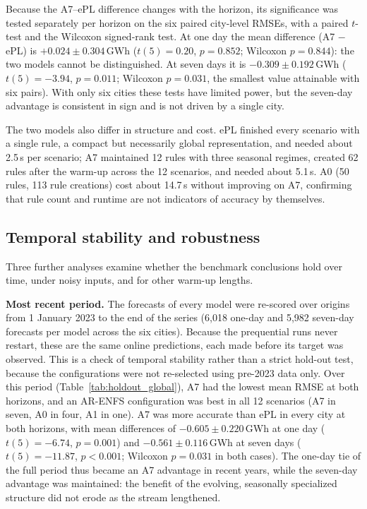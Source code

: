 \documentclass[preprint,12pt]{elsarticle}
\begin{document}
Because the A7--ePL difference changes with the horizon, its significance was tested separately per horizon on the six paired city-level RMSEs, with a paired $t$-test and the Wilcoxon signed-rank test. At one day the mean difference (A7 $-$ ePL) is $+0.024\pm0.304$\,GWh ($t(5)=0.20$, $p=0.852$; Wilcoxon $p=0.844$): the two models cannot be distinguished. At seven days it is $-0.309\pm0.192$\,GWh ($t(5)=-3.94$, $p=0.011$; Wilcoxon $p=0.031$, the smallest value attainable with six pairs). With only six cities these tests have limited power, but the seven-day advantage is consistent in sign and is not driven by a single city.

The two models also differ in structure and cost. ePL finished every scenario with a single rule, a compact but necessarily global representation, and needed about 2.5\,s per scenario; A7 maintained 12 rules with three seasonal regimes, created 62 rules after the warm-up across the 12 scenarios, and needed about 5.1\,s. A0 (50 rules, 113 rule creations) cost about 14.7\,s without improving on A7, confirming that rule count and runtime are not indicators of accuracy by themselves.

\subsection{Temporal stability and robustness}
\label{subsec:additional_validation}
\label{subsubsec:temporal_confirmation}
\label{subsubsec:perturbation_robustness}
\label{subsubsec:warmup_sensitivity}

Three further analyses examine whether the benchmark conclusions hold over time, under noisy inputs, and for other warm-up lengths.

\textbf{Most recent period.} The forecasts of every model were re-scored over origins from 1 January 2023 to the end of the series (6{,}018 one-day and 5{,}982 seven-day forecasts per model across the six cities). Because the prequential runs never restart, these are the same online predictions, each made before its target was observed. This is a check of temporal stability rather than a strict hold-out test, because the configurations were not re-selected using pre-2023 data only. Over this period (Table~\ref{tab:holdout_global}), A7 had the lowest mean RMSE at both horizons, and an AR-ENFS configuration was best in all 12 scenarios (A7 in seven, A0 in four, A1 in one). A7 was more accurate than ePL in every city at both horizons, with mean differences of $-0.605\pm0.220$\,GWh at one day ($t(5)=-6.74$, $p=0.001$) and $-0.561\pm0.116$\,GWh at seven days ($t(5)=-11.87$, $p<0.001$; Wilcoxon $p=0.031$ in both cases). The one-day tie of the full period thus became an A7 advantage in recent years, while the seven-day advantage was maintained: the benefit of the evolving, seasonally specialized structure did not erode as the stream lengthened.
\end{document}

